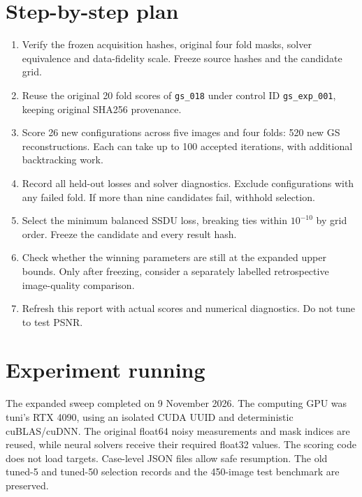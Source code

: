 \documentclass[10pt,a4paper]{article}
\begin{document}
\section{Step-by-step plan}
\begin{enumerate}[leftmargin=1.5em,itemsep=.2em]
\item Verify the frozen acquisition hashes, original four fold
masks, solver equivalence and data-fidelity scale.
Freeze source hashes and the candidate grid.
\item Reuse the original 20 fold scores of
\texttt{gs\_018} under control ID \texttt{gs\_exp\_001},
keeping original SHA256 provenance.
\item Score 26 new configurations across five images
and four folds: 520 new GS reconstructions.
Each can take up to 100 accepted iterations,
with additional backtracking work.
\item Record all held-out losses and solver diagnostics.
Exclude configurations with any failed fold.
If more than nine candidates fail, withhold selection.
\item Select the minimum balanced SSDU loss,
breaking ties within \(10^{-10}\) by grid order.
Freeze the candidate and every result hash.
\item Check whether the winning parameters are still
at the expanded upper bounds.
Only after freezing, consider a separately labelled
retrospective image-quality comparison.
\item Refresh this report with actual scores and
numerical diagnostics. Do not tune to test PSNR.
\end{enumerate}

\section{Experiment running}
The expanded sweep completed on 9 November 2026. The computing GPU was
tuni's RTX 4090, using an isolated CUDA UUID and
deterministic cuBLAS/cuDNN. The original float64
noisy measurements and mask indices are reused,
while neural solvers receive their required float32
values. The scoring code does not load targets.
Case-level JSON files allow safe resumption.
The old tuned-5 and tuned-50 selection records
and the 450-image test benchmark are preserved.
\end{document}
